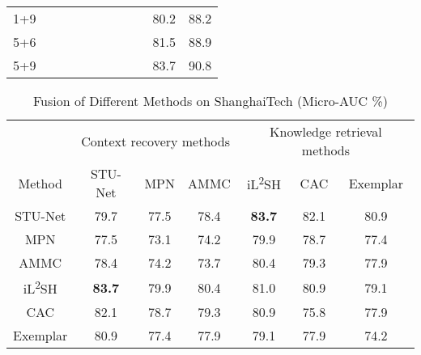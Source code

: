 \documentclass[lettersize,journal]{IEEEtran}
\begin{document}
\begin{table*}[!t]
\begin{tabular}{@{}ccccccccccc@{}}
		1+9   & \checkmark &            & \checkmark   &            & \checkmark & \checkmark &            & \checkmark & 80.2                 & 88.2          \\
		5+6   &            & \checkmark & \checkmark   & \checkmark & \checkmark &            &            &            & 81.5                 & 88.9          \\
		5+9   &            & \checkmark & \checkmark   & \checkmark & \checkmark & \checkmark &            & \checkmark & 83.7                 & 90.8          \\ \bottomrule
	\end{tabular}
\end{table*}

\begin{table}[!t]
	\centering
	\caption{Fusion of Different Methods on ShanghaiTech (Micro-AUC \%)}
	\label{tab4}
	\setlength\tabcolsep{5pt}
	\begin{tabular}{c|ccc|ccc}
		\hline
		& \multicolumn{3}{c|}{Context   recovery methods} & \multicolumn{3}{c}{Knowledge   retrieval methods} \\ \cline{2-7} 
		Method   & STU-Net        & MPN           & AMMC          & iL\textsuperscript{2}SH           & CAC            & Exemplar       \\ \hline
		STU-Net  & \textcolor[rgb]{0.5,0.5,0.5}{79.7}  & 77.5          & 78.4          & \textbf{83.7}            & 82.1           & 80.9           \\
		MPN      & 77.5           & \textcolor[rgb]{0.5,0.5,0.5}{73.1} & 74.2          & 79.9            & 78.7           & 77.4           \\
		AMMC     & 78.4           & 74.2          & \textcolor[rgb]{0.5,0.5,0.5}{73.7} & 80.4            & 79.3           & 77.9           \\ \hline
		iL\textsuperscript{2}SH    & \textbf{83.7}           & 79.9          & 80.4          & \textcolor[rgb]{0.5,0.5,0.5}{81.0}   & 80.9           & 79.1           \\
		CAC      & 82.1           & 78.7          & 79.3          & 80.9            & \textcolor[rgb]{0.5,0.5,0.5}{75.8}  & 77.9           \\
		Exemplar & 80.9           & 77.4          & 77.9          & 79.1            & 77.9           & \textcolor[rgb]{0.5,0.5,0.5}{74.2}  \\ \hline
	\end{tabular}
\end{table}
\end{document}
